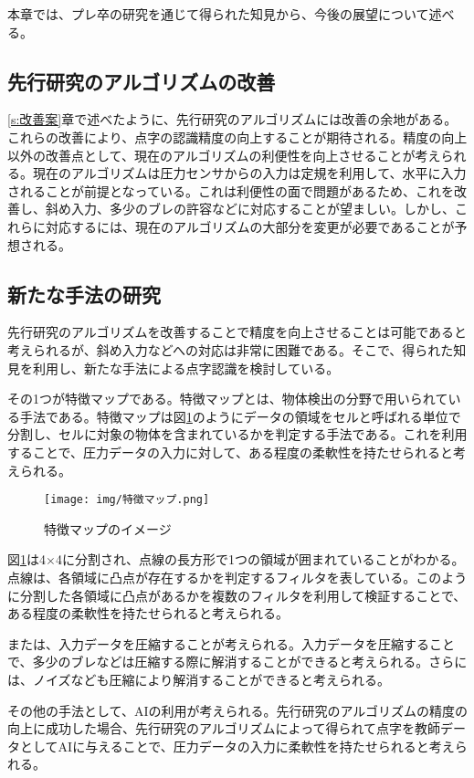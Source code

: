 本章では、プレ卒の研究を通じて得られた知見から、今後の展望について述べる。

\subsection{先行研究のアルゴリズムの改善}
\ref{s:改善案}章で述べたように、先行研究のアルゴリズムには改善の余地がある。これらの改善により、点字の認識精度の向上することが期待される。精度の向上以外の改善点として、現在のアルゴリズムの利便性を向上させることが考えられる。現在のアルゴリズムは圧力センサからの入力は定規を利用して、水平に入力されることが前提となっている。これは利便性の面で問題があるため、これを改善し、斜め入力、多少のブレの許容などに対応することが望ましい。しかし、これらに対応するには、現在のアルゴリズムの大部分を変更が必要であることが予想される。

\subsection{新たな手法の研究}
先行研究のアルゴリズムを改善することで精度を向上させることは可能であると考えられるが、斜め入力などへの対応は非常に困難である。そこで、得られた知見を利用し、新たな手法による点字認識を検討している。

その1つが特徴マップである。特徴マップとは、物体検出の分野で用いられている手法である。特徴マップは図\ref{f:特徴マップ}のようにデータの領域をセルと呼ばれる単位で分割し、セルに対象の物体を含まれているかを判定する手法である。これを利用することで、圧力データの入力に対して、ある程度の柔軟性を持たせられると考えられる。
\begin{figure}[H]
	\centering
	\texttt{[image: img/特徴マップ.png]}
	\caption{特徴マップのイメージ}
	\label{f:特徴マップ}
\end{figure}
図\ref{f:特徴マップ}は4$\times$4に分割され、点線の長方形で1つの領域が囲まれていることがわかる。点線は、各領域に凸点が存在するかを判定するフィルタを表している。このように分割した各領域に凸点があるかを複数のフィルタを利用して検証することで、ある程度の柔軟性を持たせられると考えられる。

または、入力データを圧縮することが考えられる。入力データを圧縮することで、多少のブレなどは圧縮する際に解消することができると考えられる。さらには、ノイズなども圧縮により解消することができると考えられる。

その他の手法として、AIの利用が考えられる。先行研究のアルゴリズムの精度の向上に成功した場合、先行研究のアルゴリズムによって得られて点字を教師データとしてAIに与えることで、圧力データの入力に柔軟性を持たせられると考えられる。
